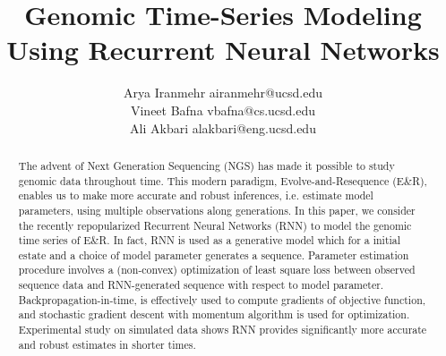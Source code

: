 \documentclass[twoside,11pt]{article}
\date
\begin{document}
\title{Genomic Time-Series Modeling Using Recurrent Neural Networks}
\author{\name Arya Iranmehr  \email airanmehr@ucsd.edu \\ 
\name Vineet Bafna \email vbafna@cs.ucsd.edu \\
\name Ali Akbari \email alakbari@eng.ucsd.edu }

\maketitle
\begin{abstract}
The advent of Next Generation Sequencing (NGS) has made it possible to study genomic data throughout time. This modern paradigm, Evolve-and-Resequence (E\&R), enables us to make more accurate and robust inferences, i.e. estimate model parameters, using multiple observations along generations. In this paper, we consider the recently repopularized Recurrent Neural Networks (RNN) to model the genomic time series of E\&R. In fact, RNN is used as a generative model which for a initial estate and a choice of model parameter generates a sequence. Parameter estimation procedure involves a (non-convex) optimization of least square loss between observed sequence data and RNN-generated sequence with respect to model parameter. Backpropagation-in-time, is effectively used to compute gradients of objective function, and stochastic gradient descent with momentum algorithm is used for  optimization. Experimental study on simulated data shows RNN provides significantly more accurate and robust estimates in shorter times.
\end{abstract}









\end{document}
